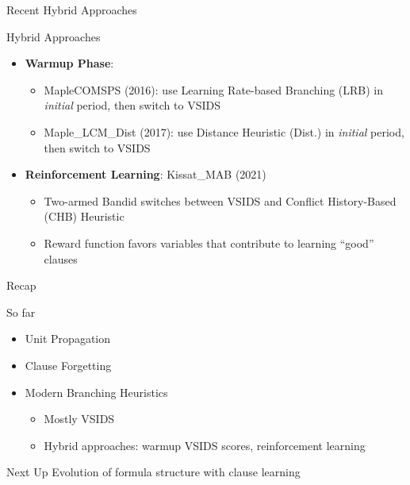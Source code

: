 \documentclass[t]{sdqbeamer}
\begin{document}
\begin{frame}{Recent Hybrid Approaches}
\begin{block}{Hybrid Approaches} 
\begin{itemize}\setlength{\itemsep}{1em}
\item {\bf Warmup Phase}:
\begin{itemize}\setlength{\itemsep}{1ex}
    \item MapleCOMSPS (2016): use Learning Rate-based Branching (LRB) in \emph{initial} period, then switch to VSIDS
    \item Maple\_LCM\_Dist (2017): use Distance Heuristic (Dist.) in \emph{initial} period, then switch to VSIDS
\end{itemize}
\item {\bf Reinforcement Learning}: Kissat\_MAB (2021)
\begin{itemize}\setlength{\itemsep}{1ex}
    \item Two-armed Bandid switches between VSIDS and Conflict History-Based (CHB) Heuristic
    \item Reward function favors variables that contribute to learning ``good'' clauses
    \end{itemize}
\end{itemize}
\end{block}
\end{frame}


\begin{frame}{Recap}
    \begin{block}{So far}
        \begin{itemize}
            \item Unit Propagation
            \item Clause Forgetting
            \item Modern Branching Heuristics
            \begin{itemize}
                \item Mostly VSIDS
                \item Hybrid approaches: warmup VSIDS scores, reinforcement learning
            \end{itemize}
        \end{itemize}
    \end{block}
    \begin{block}{Next Up}
        Evolution of formula structure with clause learning
    \end{block}
\end{frame}
\end{document}
